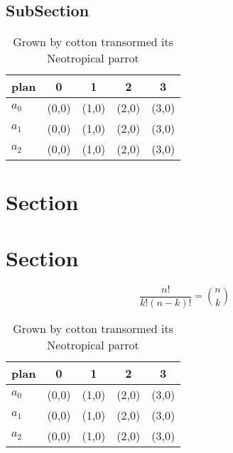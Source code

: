 \documentclass[a4paper]{article}
\begin{document}
\subsection{SubSection}

\begin{table}
\begin{adjustbox}{width=0.6\columnwidth}
\begin{tabular}{|l|l|l|l|l|}
\hline
\textbf{plan} & \multicolumn{1}{c|}{\textbf{0}} & \multicolumn{1}{c|}{\textbf{1}} & \multicolumn{1}{c|}{\textbf{2}} & \multicolumn{1}{c|}{\textbf{3}} \\ \hline
\textbf{$a_0$}  & (0,0) & (1,0) & (2,0) & (3,0) \\ \hline
\textbf{$a_1$}  & (0,0) & (1,0) & (2,0) & (3,0) \\ \hline
\textbf{$a_2$}  & (0,0) & (1,0) & (2,0) & (3,0) \\ \hline
\end{tabular}
\end{adjustbox}
\caption{Grown by cotton transormed its Neotropical parrot
}
\end{table}

\section{Section}

\section{Section}

\[ \frac{n!}{k!(n-k)!} = \binom{n}{k} \]

\begin{table}
\begin{adjustbox}{width=0.6\columnwidth}
\begin{tabular}{|l|l|l|l|l|}
\hline
\textbf{plan} & \multicolumn{1}{c|}{\textbf{0}} & \multicolumn{1}{c|}{\textbf{1}} & \multicolumn{1}{c|}{\textbf{2}} & \multicolumn{1}{c|}{\textbf{3}} \\ \hline
\textbf{$a_0$}  & (0,0) & (1,0) & (2,0) & (3,0) \\ \hline
\textbf{$a_1$}  & (0,0) & (1,0) & (2,0) & (3,0) \\ \hline
\textbf{$a_2$}  & (0,0) & (1,0) & (2,0) & (3,0) \\ \hline
\end{tabular}
\end{adjustbox}
\caption{Grown by cotton transormed its Neotropical parrot
}
\end{table}
\end{document}
